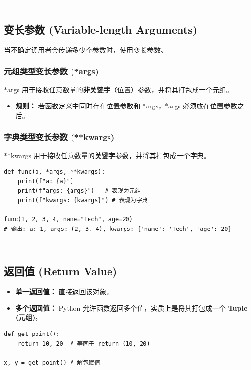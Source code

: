\documentclass{article}
\begin{document}
---

\subsection{变长参数 (Variable-length Arguments)}

当不确定调用者会传递多少个参数时，使用变长参数。

\subsubsection{元组类型变长参数 (*args)}
*args 用于接收任意数量的\textbf{非关键字}（位置）参数，并将其打包成一个元组。
\begin{itemize}
    \item \textbf{规则：} 若函数定义中同时存在位置参数和 *args，*args 必须放在位置参数之后。
\end{itemize}

\subsubsection{字典类型变长参数 (**kwargs)}
**kwargs 用于接收任意数量的\textbf{关键字}参数，并将其打包成一个字典。

\begin{lstlisting}
def func(a, *args, **kwargs):
    print(f"a: {a}")
    print(f"args: {args}")   # 表现为元组
    print(f"kwargs: {kwargs}") # 表现为字典

func(1, 2, 3, 4, name="Tech", age=20)
# 输出: a: 1, args: (2, 3, 4), kwargs: {'name': 'Tech', 'age': 20}
\end{lstlisting}

---

\subsection{返回值 (Return Value)}
\begin{itemize}
    \item \textbf{单一返回值：} 直接返回该对象。
    \item \textbf{多个返回值：} Python 允许函数返回多个值，实质上是将其打包成一个 \textbf{Tuple (元组)}。
\end{itemize}

\begin{lstlisting}
def get_point():
    return 10, 20  # 等同于 return (10, 20)

x, y = get_point() # 解包赋值
\end{lstlisting}
\end{document}
